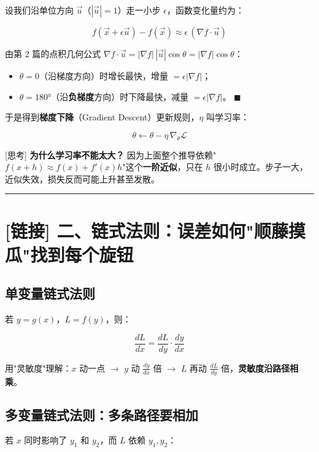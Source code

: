 设我们沿单位方向 $\vec{u}$（$|\vec{u}| = 1$）走一小步 $\epsilon$，函数变化量约为：

\[
f(\vec{x} + \epsilon\vec{u}) - f(\vec{x}) \approx \epsilon \, (\nabla f \cdot \vec{u})
\]

由第 2 篇的点积几何公式 $\nabla f \cdot \vec{u} = |\nabla f| \, |\vec{u}| \cos\theta = |\nabla f| \cos\theta$：
\begin{itemize}
  \item $\theta = 0$（沿梯度方向）时增长最快，增量 $= \epsilon |\nabla f|$；
  \item $\theta = 180°$（沿\textbf{负梯度}方向）时下降最快，减量 $= \epsilon |\nabla f|$。 $\blacksquare$
\end{itemize}

于是得到\textbf{梯度下降}（Gradient Descent）更新规则，$\eta$ 叫学习率：

\[
\theta \leftarrow \theta - \eta \, \nabla_\theta \mathcal{L}
\]

\begin{tipBox}[核心直觉与思考]
{}[思考] \textbf{为什么学习率不能太大？} 因为上面整个推导依赖"$f(x+h) \approx f(x) + f'(x)h$"这个\textbf{一阶近似}，只在 $h$ 很小时成立。步子一大，近似失效，损失反而可能上升甚至发散。
\end{tipBox}

\vspace{0.8em}\hrule\vspace{0.8em}

\section{[链接] 二、链式法则：误差如何"顺藤摸瓜"找到每个旋钮}

\subsection{单变量链式法则}

若 $y = g(x)$，$L = f(y)$，则：

\[
\frac{dL}{dx} = \frac{dL}{dy} \cdot \frac{dy}{dx}
\]

用"灵敏度"理解：$x$ 动一点 $\rightarrow$ $y$ 动 $\frac{dy}{dx}$ 倍 $\rightarrow$ $L$ 再动 $\frac{dL}{dy}$ 倍，\textbf{灵敏度沿路径相乘}。

\subsection{多变量链式法则：多条路径要相加}

若 $x$ 同时影响了 $y_1$ 和 $y_2$，而 $L$ 依赖 $y_1, y_2$：

